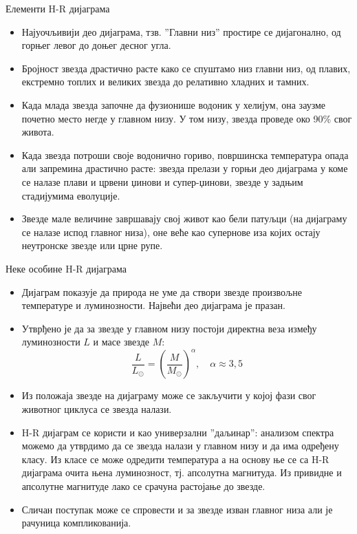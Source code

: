 \documentclass[aspectratio=169, xcolor=table, 10pt]{beamer}
\theoremstyle{definition}
\begin{document}
\begin{frame}{Елементи H-R дијаграма}
  \begin{itemize}
    \item Најуочљивији део дијаграма, тзв. ”Главни низ” простире се дијагонално, од горњег левог до доњег десног угла.
    \item Бројност звезда драстично расте како се спуштамо низ главни низ, од плавих, екстремно топлих и великих звезда до релативно хладних и тамних.
    \item Када млада звезда започне да фузионише водоник у хелијум, она заузме почетно место негде у главном низу. У том низу, звезда проведе око 90\% свог живота.
    \item Када звезда потроши своје водонично гориво, површинска температура опада али запремина драстично расте: звезда прелази у горњи део дијаграма у коме се налазе плави и црвени џинови и супер-џинови, звезде у задњим стадијумима еволуције.
    \item Звезде мале величине завршавају свој живот као бели патуљци (на дијаграму се налазе испод главног низа), оне веће као супернове иза којих остају неутронске звезде или црне рупе.
  \end{itemize}
\end{frame}

\begin{frame}{Неке особине H-R дијаграма}
  \begin{itemize}
    \item Дијаграм показује да природа не уме да створи звезде произвољне температуре и луминозности. Највећи део дијаграма је празан.
    \item Утврђено је да за звезде у главном низу постоји директна веза између луминозности $L$ и масе звезде $M$:
      \begin{equation*}
        \frac{L}{L_\odot}=\left(\frac{M}{M_\odot}\right)^\alpha,\quad \alpha\approx 3,5
      \end{equation*}
    \item Из положаја звезде на дијаграму може се закључити у којој фази свог животног циклуса се звезда налази.
    \item H-R дијаграм се користи и као универзални ”даљинар”: анализом спектра можемо да утврдимо да се звезда налази у главном низу и да има одређену класу. Из класе се може одредити температура а на основу ње се са H-R дијаграма очита њена луминозност, тј. апсолутна магнитуда. Из привидне и апсолутне магнитуде лако се срачуна растојање до звезде.
    \item Сличан поступак може се спровести и за звезде изван главног низа али је рачуница компликованија.
  \end{itemize}
\end{frame}
\end{document}
